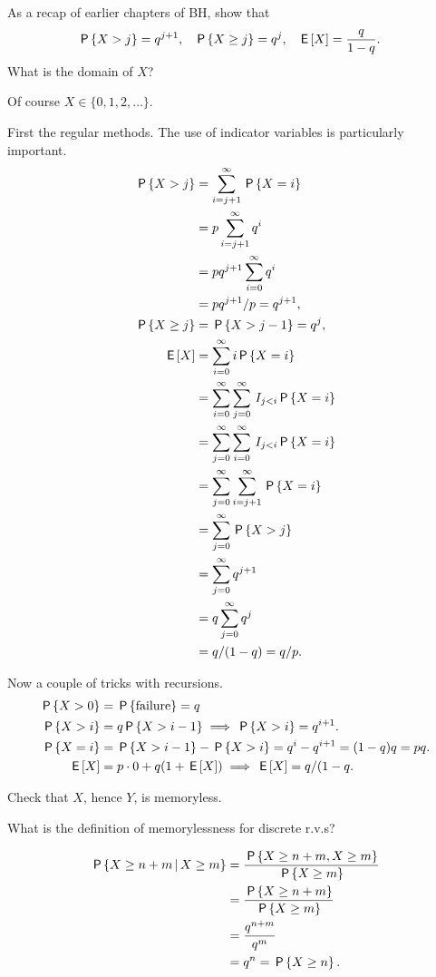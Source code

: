 \documentclass[a4paper,12pt]{article}
\begin{document}
\begin{exercise}
As a recap of earlier chapters of BH, show that
\begin{align}
  \label{eq:9}
\,\mathsf{P}\left\{X>j\right\} &= q^{j+1}, &\,\mathsf{P}\left\{X\geq j\right\} &=q^j,& \,\mathsf{E}\left[X\right]&=\frac q{1-q}.
 \end{align}
What is the domain of $X$?
\begin{solution}
Of course $X \in \{0, 1, 2, \ldots\}$.

First the regular methods. The use of indicator variables is particularly important.
  \begin{align}
    \label{eq:5}
\,\mathsf{P}\left\{X>j\right\}    
&= \sum_{i=j+1}^{\infty} \,\mathsf{P}\left\{X=i\right\} \\
&= p\sum_{i=j+1}^{\infty} q^{i} \\
&= pq^{j+1}\sum_{i=0}^{\infty} q^{i} \\
&= pq^{j+1}/p = q^{j+1},\\
  \,\mathsf{P}\left\{X\geq j\right\}  &= \,\mathsf{P}\left\{X>j-1\right\} = q^{j}, \\
\,\mathsf{E}\left[X\right] 
&= \sum_{i=0}^{\infty} i\,\mathsf{P}\left\{X=i\right\} \\
&=  \sum_{i=0}^{\infty} \sum_{j=0}^{\infty} \,I_{j<i} \,\mathsf{P}\left\{X=i\right\} \\
&=  \sum_{j=0}^{\infty} \sum_{i=0}^{\infty} \,I_{j<i} \,\mathsf{P}\left\{X=i\right\} \\
&=  \sum_{j=0}^{\infty} \sum_{i=j+1}^{\infty}  \,\mathsf{P}\left\{X=i\right\} \\
&=  \sum_{j=0}^{\infty}  \,\mathsf{P}\left\{X>j\right\} \\
&=  \sum_{j=0}^{\infty}  q^{j+1}\\
&=  q \sum_{j=0}^{\infty}  q^{j}\\
&=  q/(1-q) = q/p.
  \end{align}


Now a couple of tricks with recursions.
\begin{align}
  \label{eq:8}
\,\mathsf{P}\left\{X>0\right\} &= \,\mathsf{P}\left\{\textrm{failure}\right\} = q\\
\,\mathsf{P}\left\{X>i\right\} &= q \,\mathsf{P}\left\{X>i-1\right\} \implies \,\mathsf{P}\left\{X>i\right\}=q^{i+1}.\\
\,\mathsf{P}\left\{X=i\right\} &= \,\mathsf{P}\left\{X>i-1\right\} - \,\mathsf{P}\left\{X>i\right\} = q^{i}-q^{i+1} = (1-q)q = p q.\\
\,\mathsf{E}\left[X\right] &= p\cdot 0 + q(1+\,\mathsf{E}\left[X\right]) \implies \,\mathsf{E}\left[X\right] = q/(1-q.
\end{align}

\end{solution}
\end{exercise}

\begin{exercise}
Check that $X$, hence $Y$, is memoryless.
\begin{hint}
What is the definition of memorylessness for discrete r.v.s?  
\end{hint}
\begin{solution}
  \begin{align}
    \label{eq:13}
\,\mathsf{P}\left\{X\geq n+m\,\middle|\, X\geq m\right\} 
&= \frac{ \,\mathsf{P}\left\{X\geq n+m,  X\geq m\right\}}{\,\mathsf{P}\left\{X\geq m\right\}} \\
&= \frac{ \,\mathsf{P}\left\{X\geq n+m\right\}}{\,\mathsf{P}\left\{X\geq m\right\}} \\
&= \frac{ q^{n+m}}{q^m} \\
&= q^n= \,\mathsf{P}\left\{X\geq n\right\}.
  \end{align}
\end{solution}
\end{exercise}
\end{document}
